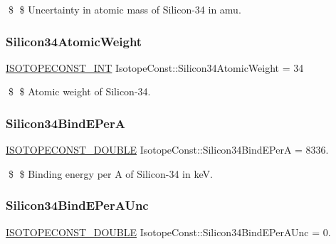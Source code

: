 \$ \$ Uncertainty in atomic mass of Silicon-\/34 in amu. \mbox{\label{group___isotope_const-_silicon-_si34_ga01faed44eb196df4d3f01edffc4d335a}} 
\subsubsection{\texorpdfstring{Silicon34\+Atomic\+Weight}{Silicon34AtomicWeight}}
{\footnotesize\ttfamily \mbox{\hyperlink{group___isotope_const-_macros_ga5f18360b3e99483a35c32d789e62621c}{I\+S\+O\+T\+O\+P\+E\+C\+O\+N\+S\+T\+\_\+\+I\+NT}} Isotope\+Const\+::\+Silicon34\+Atomic\+Weight = 34}

\$ \$ Atomic weight of Silicon-\/34. \mbox{\label{group___isotope_const-_silicon-_si34_gae561156e32b400a65378e7389297f8a7}} 
\subsubsection{\texorpdfstring{Silicon34\+Bind\+E\+PerA}{Silicon34BindEPerA}}
{\footnotesize\ttfamily \mbox{\hyperlink{group___isotope_const-_macros_ga8f45a7272ce02c0b4c65c44636ed719a}{I\+S\+O\+T\+O\+P\+E\+C\+O\+N\+S\+T\+\_\+\+D\+O\+U\+B\+LE}} Isotope\+Const\+::\+Silicon34\+Bind\+E\+PerA = 8336.}

\$ \$ Binding energy per A of Silicon-\/34 in keV. \mbox{\label{group___isotope_const-_silicon-_si34_ga6d6098e562a1841bcb451eec572e3817}} 
\subsubsection{\texorpdfstring{Silicon34\+Bind\+E\+Per\+A\+Unc}{Silicon34BindEPerAUnc}}
{\footnotesize\ttfamily \mbox{\hyperlink{group___isotope_const-_macros_ga8f45a7272ce02c0b4c65c44636ed719a}{I\+S\+O\+T\+O\+P\+E\+C\+O\+N\+S\+T\+\_\+\+D\+O\+U\+B\+LE}} Isotope\+Const\+::\+Silicon34\+Bind\+E\+Per\+A\+Unc = 0.}

